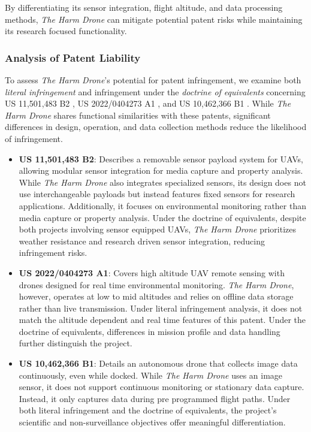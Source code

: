 \documentclass[12pt]{article}
\begin{document}
\par By differentiating its sensor integration, flight altitude, and data processing methods, \textit{The Harm Drone} can mitigate potential patent risks while maintaining its research focused functionality.

\subsubsection{Analysis of Patent Liability}

\par To assess \textit{The Harm Drone}'s potential for patent infringement, we examine both \textit{literal infringement} and infringement under the \textit{doctrine of equivalents} concerning US 11,501,483 B2 \cite{speasl2022payload}, US 2022/0404273 A1 \cite{kendall2022remote}, and US 10,462,366 B1 \cite{bart2019autodrone}. While \textit{The Harm Drone} shares functional similarities with these patents, significant differences in design, operation, and data collection methods reduce the likelihood of infringement.

\begin{itemize}
    \item \textbf{US 11,501,483 B2}: Describes a removable sensor payload system for UAVs, allowing modular sensor integration for media capture and property analysis. While \textit{The Harm Drone} also integrates specialized sensors, its design does not use interchangeable payloads but instead features fixed sensors for research applications. Additionally, it focuses on environmental monitoring rather than media capture or property analysis. Under the doctrine of equivalents, despite both projects involving sensor equipped UAVs, \textit{The Harm Drone} prioritizes weather resistance and research driven sensor integration, reducing infringement risks.

    \item \textbf{US 2022/0404273 A1}: Covers high altitude UAV remote sensing with drones designed for real time environmental monitoring. \textit{The Harm Drone}, however, operates at low to mid altitudes and relies on offline data storage rather than live transmission. Under literal infringement analysis, it does not match the altitude dependent and real time features of this patent. Under the doctrine of equivalents, differences in mission profile and data handling further distinguish the project.

    \item \textbf{US 10,462,366 B1}: Details an autonomous drone that collects image data continuously, even while docked. While \textit{The Harm Drone} uses an image sensor, it does not support continuous monitoring or stationary data capture. Instead, it only captures data during pre programmed flight paths. Under both literal infringement and the doctrine of equivalents, the project's scientific and non-surveillance objectives offer meaningful differentiation.
\end{itemize}
\end{document}
